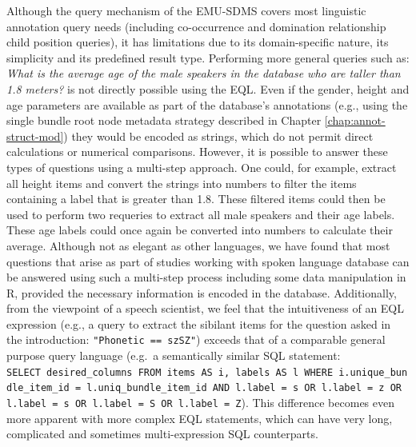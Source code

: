 \documentclass[]{book}
\begin{document}
Although the query mechanism of the EMU-SDMS covers most linguistic annotation query needs (including co-occurrence and domination relationship child position queries), it has limitations due to its domain-specific nature, its simplicity and its predefined result type. Performing more general queries such as: \emph{What is the average age of the male speakers in the database who are taller than 1.8 meters?} is not directly possible using the EQL. Even if the gender, height and age parameters are available as part of the database's annotations (e.g., using the single bundle root node metadata strategy described in Chapter \ref{chap:annot-struct-mod}) they would be encoded as strings, which do not permit direct calculations or numerical comparisons. However, it is possible to answer these types of questions using a multi-step approach. One could, for example, extract all height items and convert the strings into numbers to filter the items containing a label that is greater than 1.8. These filtered items could then be used to perform two requeries to extract all male speakers and their age labels. These age labels could once again be converted into numbers to calculate their average. Although not as elegant as other languages, we have found that most questions that arise as part of studies working with spoken language database can be answered using such a multi-step process including some data manipulation in R, provided the necessary information is encoded in the database. Additionally, from the viewpoint of a speech scientist, we feel that the intuitiveness of an EQL expression (e.g., a query to extract the sibilant items for the question asked in the introduction: \texttt{"Phonetic\ ==\ s\textbar{}z\textbar{}S\textbar{}Z"}) exceeds that of a comparable general purpose query language (e.g.~a semantically similar SQL statement: \texttt{SELECT\ desired\_columns\ FROM\ items\ AS\ i,\ labels\ AS\ l\ WHERE\ i.unique\_bundle\_item\_id\ =\ l.uniq\_bundle\_item\_id\ AND\ l.label\ =\ \textquotesingle{}s\textquotesingle{}\ OR\ l.label\ =\ \textquotesingle{}z\textquotesingle{}\ OR\ l.label\ =\ \textquotesingle{}s\textquotesingle{}\ OR\ l.label\ =\ \textquotesingle{}S\textquotesingle{}\ OR\ l.label\ =\ \textquotesingle{}Z\textquotesingle{}}). This difference becomes even more apparent with more complex EQL statements, which can have very long, complicated and sometimes multi-expression SQL counterparts.
\end{document}
